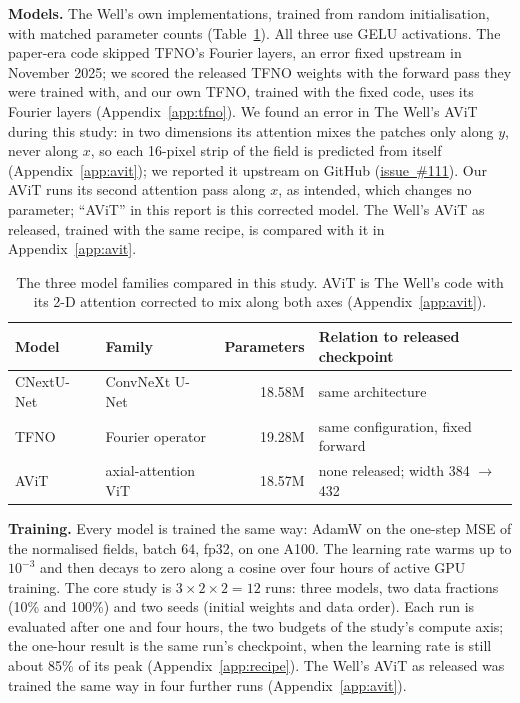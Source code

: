 \documentclass[11pt]{article}
\begin{document}
\textbf{Models.} The Well's own implementations, trained from random initialisation, with matched parameter
counts (Table~\ref{tab:models}). All three use GELU activations. The paper-era code skipped TFNO's Fourier layers, an
error fixed upstream in November 2025; we scored the released TFNO weights with the forward pass they were trained
with, and our own TFNO, trained with the fixed code, uses its Fourier layers (Appendix~\ref{app:tfno}). We found an
error in The Well's AViT during this study: in two dimensions its attention mixes the patches only along $y$, never
along $x$, so each 16-pixel strip of the field is predicted from itself (Appendix~\ref{app:avit}); we reported it
upstream on GitHub (\href{https://github.com/PolymathicAI/the_well/issues/111}{issue~\#111}). Our AViT runs its second attention pass along $x$, as intended, which changes
no parameter; ``AViT'' in this report is this corrected model. The Well's AViT as released, trained with the same
recipe, is compared with it in Appendix~\ref{app:avit}.

\begin{table}[tp]
\centering\footnotesize
\begin{tabular*}{\linewidth}{@{\extracolsep{\fill}}llrl@{}}
\toprule
Model & Family & Parameters & Relation to released checkpoint \\
\midrule
CNextU-Net~\cite{liu2022convnext} & ConvNeXt U-Net & 18.58M & same architecture \\
TFNO~\cite{li2021fno,kossaifi2024tfno} & Fourier operator & 19.28M & same configuration, fixed forward \\
AViT~\cite{mccabe2024mpp} & axial-attention ViT & 18.57M & none released; width 384 $\to$ 432 \\
\bottomrule
\end{tabular*}
\caption{The three model families compared in this study. AViT is The Well's code with its 2-D attention corrected
to mix along both axes (Appendix~\ref{app:avit}).}
\label{tab:models}
\end{table}

\textbf{Training.} Every model is trained the same way: AdamW on the one-step MSE of the normalised fields, batch
64, fp32, on one A100. The learning rate warms up to $10^{-3}$ and then decays to zero along a cosine over four hours
of active GPU training. The core study is $3\times2\times2=12$ runs: three models, two data fractions (10\% and
100\%) and two seeds (initial weights and data order). Each run is evaluated after one and four hours, the two
budgets of the study's compute axis; the one-hour result is the same run's checkpoint, when the learning rate is
still about 85\% of its peak (Appendix~\ref{app:recipe}). The Well's AViT as released was trained the same way in
four further runs (Appendix~\ref{app:avit}).
\end{document}
